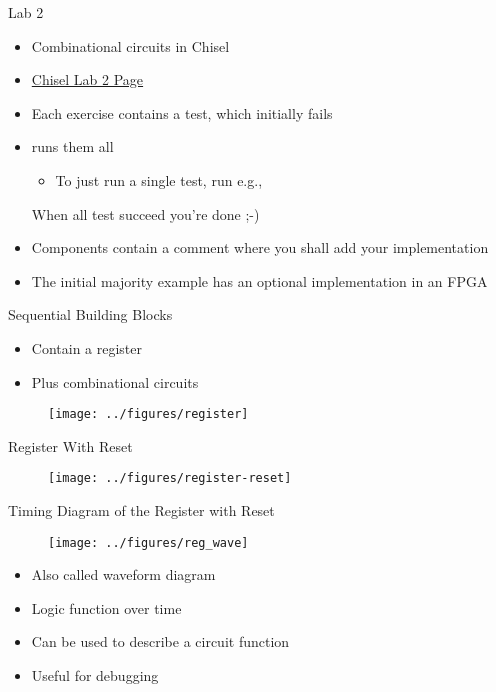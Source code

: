 \begin{frame}[fragile]{Lab 2}
\begin{itemize}
\item Combinational circuits in Chisel
\item \href{https://github.com/schoeberl/chisel-lab/tree/master/lab2}{Chisel Lab 2 Page}
\item Each exercise contains a test, which initially fails
\item {} runs them all
\begin{itemize}
\item To just run a single test, run e.g.,\\
\end{itemize}
When all test succeed you're done ;-)
\item Components contain a comment where you shall add your implementation
\item The initial majority example has an optional implementation in an FPGA
\end{itemize}
\end{frame}

\begin{frame}[fragile]{Sequential Building Blocks}
\begin{itemize}
\item Contain a register
\item Plus combinational circuits
\end{itemize}
\begin{figure}
  \texttt{[image: ../figures/register]}
\end{figure}
\end{frame}

\begin{frame}[fragile]{Register With Reset}
\begin{figure}
  \texttt{[image: ../figures/register-reset]}
\end{figure}
\end{frame}

\begin{frame}[fragile]{Timing Diagram of the Register with Reset}
\begin{figure}
  \texttt{[image: ../figures/reg\_wave]}
\end{figure}
\begin{itemize}
\item Also called waveform diagram
\item Logic function over time
\item Can be used to describe a circuit function
\item Useful for debugging
\end{itemize}
\end{frame}

